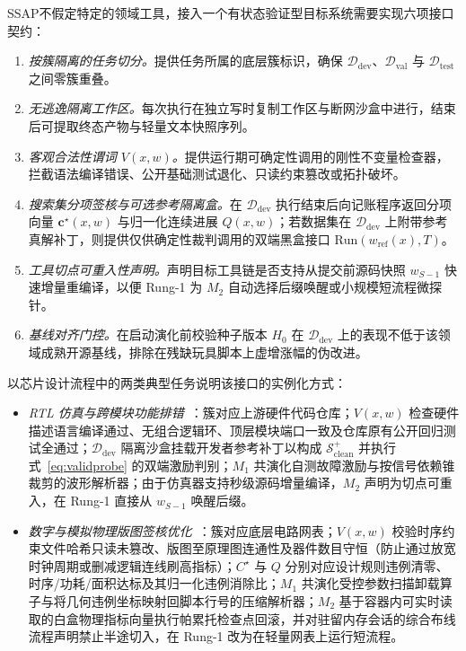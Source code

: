 \documentclass[UTF8,a4paper,10.5pt]{ctexart}
\newcommand{\method}{SSAP}
\newcommand{\Ddev}{\mathcal{D}_{\mathrm{dev}}}
\newcommand{\Dval}{\mathcal{D}_{\mathrm{val}}}
\newcommand{\Dtest}{\mathcal{D}_{\mathrm{test}}}
\newcommand{\Sclean}{\mathcal{S}^+_{\mathrm{clean}}}
\begin{document}
\method{}不假定特定的领域工具，接入一个有状态验证型目标系统需要实现六项接口契约：
\begin{enumerate}
  \item \emph{按簇隔离的任务切分。}提供任务所属的底层簇标识，确保 $\Ddev$、$\Dval$ 与 $\Dtest$ 之间零簇重叠。
  \item \emph{无逃逸隔离工作区。}每次执行在独立写时复制工作区与断网沙盒中进行，结束后可提取终态产物与轻量文本快照序列。
  \item \emph{客观合法性谓词 $V(x,w)$。}提供运行期可确定性调用的刚性不变量检查器，拦截语法编译错误、公开基础测试退化、只读约束篡改或拓扑破坏。
  \item \emph{搜索集分项签核与可选参考隔离盒。}在 $\Ddev$ 执行结束后向记账程序返回分项向量 $\mathbf{c}^\star(x,w)$ 与归一化连续进展 $Q(x,w)$；若数据集在 $\Ddev$ 上附带参考真解补丁，则提供仅供确定性裁判调用的双端黑盒接口 $\mathrm{Run}(w_{\mathrm{ref}}(x), T)$。
  \item \emph{工具切点可重入性声明。}声明目标工具链是否支持从提交前源码快照 $w_{S-1}$ 快速增量重编译，以便 Rung-1 为 $M_2$ 自动选择后缀唤醒或小规模短流程微探针。
  \item \emph{基线对齐门控。}在启动演化前校验种子版本 $H_0$ 在 $\Ddev$ 上的表现不低于该领域成熟开源基线，排除在残缺玩具脚本上虚增涨幅的伪改进。
\end{enumerate}

以芯片设计流程中的两类典型任务说明该接口的实例化方式：
\begin{itemize}
  \item \emph{RTL 仿真与跨模块功能排错}~\cite{phoenix}：簇对应上游硬件代码仓库；$V(x,w)$ 检查硬件描述语言编译通过、无组合逻辑环、顶层模块端口一致及仓库原有公开回归测试全通过；$\Ddev$ 隔离沙盒挂载开发者参考补丁以构成 $\Sclean$ 并执行式~\eqref{eq:validprobe} 的双端激励判别；$M_1$ 共演化自测故障激励与按信号依赖锥裁剪的波形解析器；由于仿真器支持秒级源码增量编译，$M_2$ 声明为切点可重入，在 Rung-1 直接从 $w_{S-1}$ 唤醒后缀。
  \item \emph{数字与模拟物理版图签核优化}~\cite{posteda,alw}：簇对应底层电路网表；$V(x,w)$ 校验时序约束文件哈希只读未篡改、版图至原理图连通性及器件数目守恒（防止通过放宽时钟周期或删减逻辑连线刷高指标）；$C^\star$ 与 $Q$ 分别对应设计规则违例清零、时序/功耗/面积达标及其归一化违例消除比；$M_1$ 共演化受控参数扫描卸载算子与将几何违例坐标映射回脚本行号的压缩解析器；$M_2$ 基于容器内可实时读取的白盒物理指标向量执行帕累托检查点回滚，并对驻留内存会话的综合布线流程声明禁止半途切入，在 Rung-1 改为在轻量网表上运行短流程。
\end{itemize}
\end{document}
